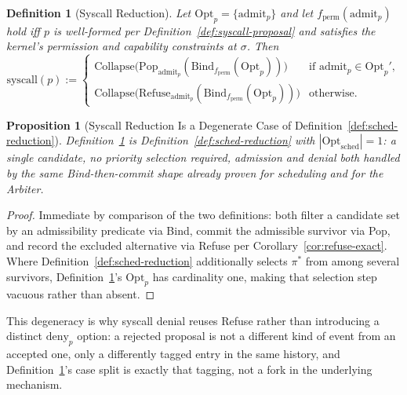 \documentclass[11pt]{article}
\newtheorem{definition}{Definition}[section]
\newtheorem{proposition}{Proposition}[section]
\begin{document}
\begin{definition}[Syscall Reduction]
\label{def:syscall-reduction}
Let $\mathrm{Opt}_p = \{\mathrm{admit}_p\}$ and let $f_{\mathrm{perm}}(\mathrm{admit}_p)$ hold iff $p$ is well-formed per Definition~\ref{def:syscall-proposal} and satisfies the kernel's permission and capability constraints at $\sigma$. Then
\[
\mathrm{syscall}(p) :=
\begin{cases}
\mathrm{Collapse}\big(\mathrm{Pop}_{\mathrm{admit}_p}(\mathrm{Bind}_{f_{\mathrm{perm}}}(\mathrm{Opt}_p))\big) & \text{if } \mathrm{admit}_p \in \mathrm{Opt}_p',\\[4pt]
\mathrm{Collapse}\big(\mathrm{Refuse}_{\mathrm{admit}_p}(\mathrm{Bind}_{f_{\mathrm{perm}}}(\mathrm{Opt}_p))\big) & \text{otherwise.}
\end{cases}
\]
\end{definition}

\begin{proposition}[Syscall Reduction Is a Degenerate Case of Definition~\ref{def:sched-reduction}]
\label{prop:syscall-degenerate}
Definition~\ref{def:syscall-reduction} is Definition~\ref{def:sched-reduction} with $|\mathrm{Opt}_{\mathrm{sched}}| = 1$: a single candidate, no priority selection required, admission and denial both handled by the same Bind-then-commit shape already proven for scheduling and for the Arbiter.
\end{proposition}
\begin{proof}
Immediate by comparison of the two definitions: both filter a candidate set by an admissibility predicate via Bind, commit the admissible survivor via Pop, and record the excluded alternative via Refuse per Corollary~\ref{cor:refuse-exact}. Where Definition~\ref{def:sched-reduction} additionally selects $\pi^*$ from among several survivors, Definition~\ref{def:syscall-reduction}'s $\mathrm{Opt}_p$ has cardinality one, making that selection step vacuous rather than absent.
\end{proof}

This degeneracy is why syscall denial reuses Refuse rather than introducing a distinct $\mathrm{deny}_p$ option: a rejected proposal is not a different kind of event from an accepted one, only a differently tagged entry in the same history, and Definition~\ref{def:syscall-reduction}'s case split is exactly that tagging, not a fork in the underlying mechanism.
\end{document}
